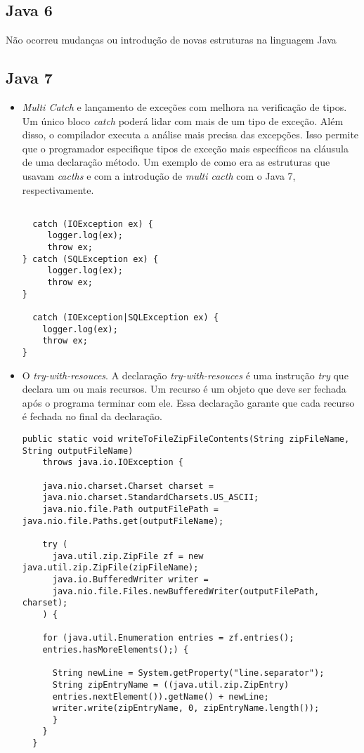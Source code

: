 \subsection {Java 6}
Não ocorreu mudanças ou introdução de novas estruturas na linguagem Java\\
\subsection {Java 7}
  \begin{itemize}
  \item {\it Multi Catch} e lançamento de exceções com melhora na verificação de tipos. Um único bloco {\it catch} poderá lidar com mais de um tipo de exceção. Além disso, o compilador executa a análise mais precisa das excepções. Isso permite que o programador especifique tipos de exceção mais específicos na cláusula de uma declaração método. Um exemplo de como era as estruturas que usavam {\it cacths} e com a introdução de {\it multi cacth} com o Java 7, respectivamente.
  \begin{verbatim}

  catch (IOException ex) {
     logger.log(ex);
     throw ex;
} catch (SQLException ex) {
     logger.log(ex);
     throw ex;
}

  catch (IOException|SQLException ex) {
    logger.log(ex);
    throw ex;
}
  \end{verbatim}
  \item O {\it try-with-resouces}. A declaração {\it try-with-resouces} é uma instrução {\it try} que declara um ou mais recursos. Um recurso é um objeto que deve ser fechada após o programa terminar com ele. Essa declaração garante que cada recurso é fechada no final da declaração.
  \begin{verbatim}
public static void writeToFileZipFileContents(String zipFileName, 
String outputFileName)
    throws java.io.IOException {

    java.nio.charset.Charset charset =
    java.nio.charset.StandardCharsets.US_ASCII;
    java.nio.file.Path outputFilePath = java.nio.file.Paths.get(outputFileName);

    try (
      java.util.zip.ZipFile zf = new java.util.zip.ZipFile(zipFileName);
      java.io.BufferedWriter writer = 
      java.nio.file.Files.newBufferedWriter(outputFilePath, charset);
    ) {

    for (java.util.Enumeration entries = zf.entries(); 
    entries.hasMoreElements();) {

      String newLine = System.getProperty("line.separator");
      String zipEntryName = ((java.util.zip.ZipEntry)
      entries.nextElement()).getName() + newLine;
      writer.write(zipEntryName, 0, zipEntryName.length());
      }
    }
  }


\end{verbatim}
\end{itemize}
